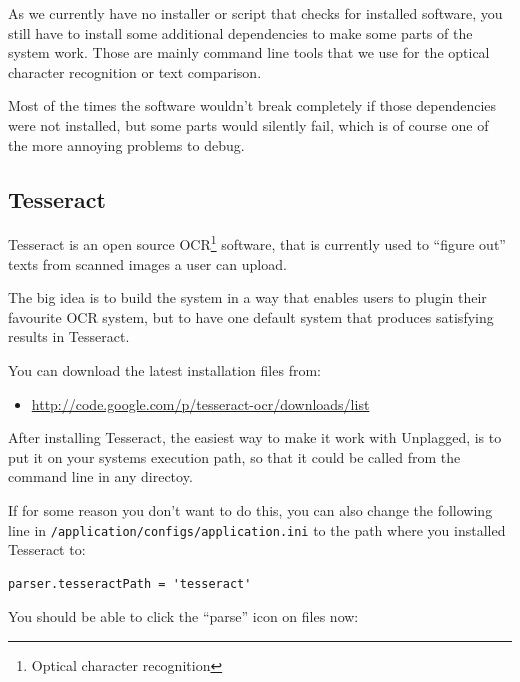 As we currently have no installer or script that checks for installed software, you still have to install some
additional dependencies to make some parts of the system work. Those are mainly command line tools that we use
for the optical character recognition or text comparison.

Most of the times the software wouldn't break completely if those dependencies were not installed, but some parts 
would silently fail, which is of course one of the more annoying problems to debug.

\subsection{Tesseract}

Tesseract is an open source OCR\footnote{Optical character recognition} software, that is currently used to \enquote{figure out}
texts from scanned images a user can upload. 

The big idea is to build the system in a way that enables users to
plugin their favourite OCR system, but to have one default system that produces satisfying results in Tesseract.

You can download the latest installation files from:

\begin{itemize}
\item \url{http://code.google.com/p/tesseract-ocr/downloads/list}
\end{itemize}

After installing Tesseract, the easiest way to make it work with Unplagged, is to put it on your systems execution path,
so that it could be called from the command line in any directoy.

If for some reason you don't want to do this, you can also change the following line in 
\texttt{/application/configs/application.ini} to the path where you installed Tesseract to:

\begin{lstlisting}[caption=Tesseract executable path]
parser.tesseractPath = 'tesseract'
\end{lstlisting}

You should be able to click the \enquote{parse} icon on files now:

